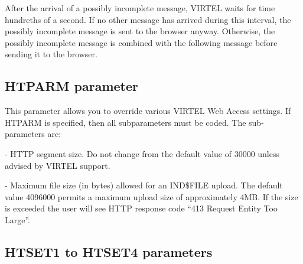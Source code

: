 \documentclass[letterpaper,10pt,english]{sphinxmanual}
\begin{document}
After the arrival of a possibly incomplete message, VIRTEL waits for time hundreths of a second. If no other message has arrived during this interval, the possibly incomplete message is sent to the browser anyway. Otherwise, the possibly incomplete message is combined with the following message before sending it to the browser.

\ignorespaces 

\subsection{HTPARM parameter}
\label{\detokenize{Installation_Guide:htparm-parameter}}\label{\detokenize{Installation_Guide:index-79}}
\begin{sphinxVerbatim}[commandchars=\\\{\}]
                 
\end{sphinxVerbatim}

This parameter allows you to override various VIRTEL Web Access settings. If HTPARM is specified, then all subparameters must be coded. The sub-parameters are:

 - HTTP segment size. Do not change from the default value of 30000 unless advised by VIRTEL support.

 - Maximum file size (in bytes) allowed for an IND\$FILE upload. The default value 4096000 permits a maximum upload size of approximately 4MB. If the size is exceeded the user will see HTTP response code “413 Request Entity Too Large”.

\ignorespaces 

\subsection{HTSET1 to HTSET4 parameters}
\label{\detokenize{Installation_Guide:htset1-to-htset4-parameters}}\label{\detokenize{Installation_Guide:index-80}}
\begin{sphinxVerbatim}[commandchars=\\\{\}]
          
\end{sphinxVerbatim}
\end{document}
